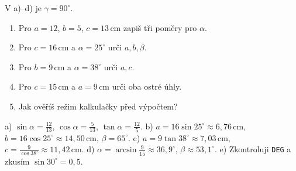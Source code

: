 \documentclass[11pt,a4paper]{article}
\begin{document}
\begin{zadaniReseniBox}[title={D1: 15–20 minut; kalkulačka ve stupních}]
V a)–d) je $\gamma=90^\circ$.
\begin{enumerate}[label=\alph*)]
\item Pro $a=12$, $b=5$, $c=13\,\mathrm{cm}$ zapiš tři poměry pro $\alpha$.
\item Pro $c=16\,\mathrm{cm}$ a $\alpha=25^\circ$ urči $a,b,\beta$.
\item Pro $b=9\,\mathrm{cm}$ a $\alpha=38^\circ$ urči $a,c$.
\item Pro $c=15\,\mathrm{cm}$ a $a=9\,\mathrm{cm}$ urči oba ostré úhly.
\item Jak ověříš režim kalkulačky před výpočtem?
\end{enumerate}
\tcblower
a) $\sin\alpha=\frac{12}{13}$, $\cos\alpha=\frac5{13}$, $\tan\alpha=\frac{12}5$.
b) $a=16\sin25^\circ\approx6{,}76\,\mathrm{cm}$,
$b=16\cos25^\circ\approx14{,}50\,\mathrm{cm}$, $\beta=65^\circ$.
c) $a=9\tan38^\circ\approx7{,}03\,\mathrm{cm}$,
$c=\frac9{\cos38^\circ}\approx11{,}42\,\mathrm{cm}$.
d) $\alpha=\arcsin\frac9{15}\approx36{,}9^\circ$, $\beta\approx53{,}1^\circ$.
e) Zkontroluji \texttt{DEG} a zkusím $\sin30^\circ=0{,}5$.
\end{zadaniReseniBox}
\end{document}
